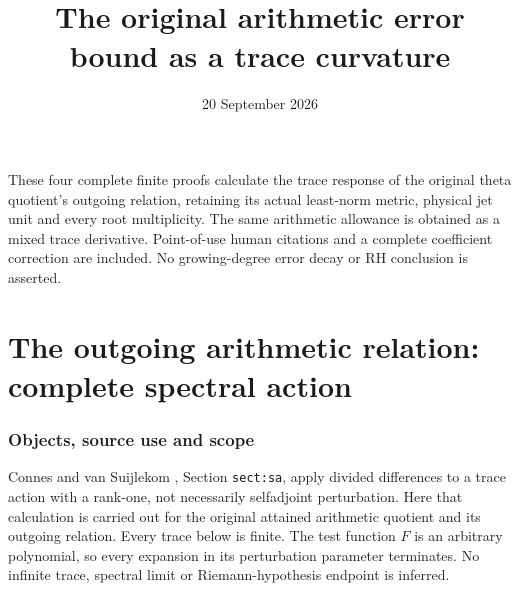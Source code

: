 \documentclass[11pt]{article}
\title{The original arithmetic error bound as a trace curvature}
\author{}\date{20 September 2026}
\begin{document}
\maketitle
These four complete finite proofs calculate the trace response of the
original theta quotient's outgoing relation, retaining its actual
least-norm metric, physical jet unit and every root multiplicity.
The same arithmetic allowance is obtained as a mixed trace derivative.
Point-of-use human citations and a complete coefficient correction are
included. No growing-degree error decay or RH conclusion is asserted.


\clearpage\begingroup
\part*{The outgoing arithmetic relation: complete spectral action}
\newcommand{\sapC}{\mathbb C}\newcommand{\sapR}{\mathbb R}
\newcommand{\saptr}{\operatorname{tr}}\newcommand{\sapRes}{\operatorname{Res}}
\newcommand{\sapid}{\operatorname{Id}}\newcommand{\sapdd}{\dagger_G}
\newtheorem{saptheorem}{Theorem}[section]
\newtheorem{saplemma}[saptheorem]{Lemma}


\section{Objects, source use and scope}

Connes and van Suijlekom \cite{sap:CV}, Section \texttt{sect:sa},
apply divided differences to a trace action with a rank-one,
not necessarily selfadjoint perturbation. Here that calculation
is carried out for the original attained arithmetic quotient
and its outgoing relation. Every trace below is finite.
The test function $F$ is an arbitrary polynomial, so every
expansion in its perturbation parameter terminates. No
infinite trace, spectral limit or Riemann-hypothesis endpoint
is inferred.
\end{document}
